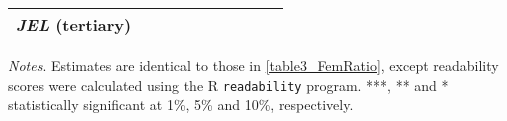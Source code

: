 \begin{table}[H]
\begin{threeparttable}
\begin{tabular}{p{2cm}S@{}S@{}S@{}S@{}S@{}S@{}S@{}S@{}S@{}}
            \textit{JEL} (tertiary)       &               &               &               &               &               &               &               &               &           {}   \\
            \bottomrule
        \end{tabular}
        \begin{tablenotes}
            \tiny
            \item \textit{Notes}. Estimates are identical to those in \autoref{table3_FemRatio}, except readability scores were calculated using the R \texttt{readability} program. ***, ** and * statistically significant at 1\%, 5\% and 10\%, respectively.
        \end{tablenotes}
    \end{threeparttable}
\end{table}
